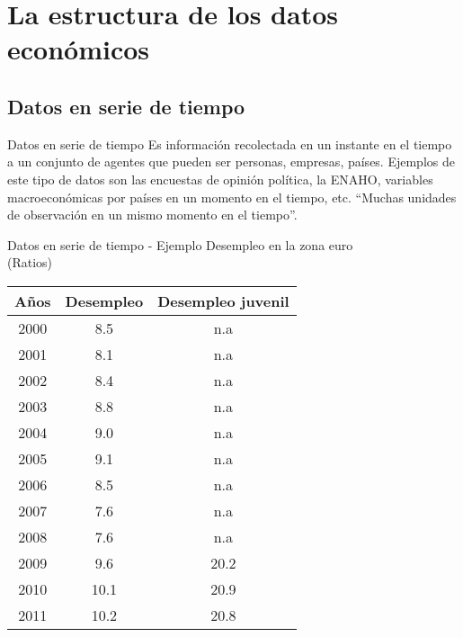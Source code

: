 \section{La estructura de los datos económicos}

\subsection{Datos en serie de tiempo}
\begin{frame}{Datos en serie de tiempo}
	Es información recolectada en un instante en el tiempo a un conjunto de agentes que pueden ser personas, empresas, países. Ejemplos de este tipo
	de datos son las encuestas de opinión política, la ENAHO, variables macroeconómicas por países en un momento en el tiempo, etc. ``Muchas unidades de observación en un mismo momento en el tiempo''.
\end{frame}
\begin{frame}{Datos en serie de tiempo - Ejemplo}
	\centering
	{\small Desempleo en la zona euro}\\
	{\tiny (Ratios)} \\
	\smallskip
	\begin{tabular}{ ccc } 
		\hline
		Años & Desempleo & Desempleo juvenil \\
		\hline\hline
		2000 & 8.5 	& n.a  \\
		2001 & 8.1 	& n.a  \\
		2002 & 8.4 	& n.a  \\
		2003 & 8.8 	& n.a  \\
		2004 & 9.0 	& n.a  \\
		2005 & 9.1 	& n.a  \\
		2006 & 8.5 	& n.a  \\
		2007 & 7.6 	& n.a  \\
		2008 & 7.6 	& n.a  \\
		2009 & 9.6 	& 20.2 \\
		2010 & 10.1 & 20.9 \\
		2011 & 10.2 & 20.8 \\
		\hline
	\end{tabular}
\end{frame}

